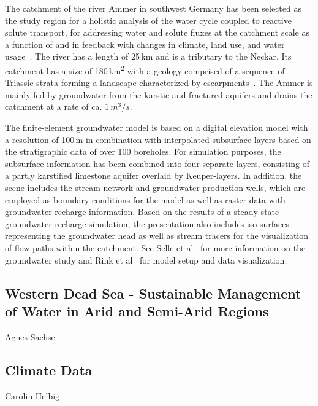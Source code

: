 \documentclass[twocolumn]{svjour3}          %
\begin{document}
The catchment of the river Ammer in southwest Germany has been selected as the study region for a holistic analysis of the water cycle coupled to reactive solute transport, for addressing water and solute fluxes at the catchment scale as a function of and in feedback with changes in climate, land use, and water usage~\cite{grathwohl:wessti}. The river has a length of 25\,km and is a tributary to the Neckar. Its catchment has a size of 180\,km\textsuperscript{2} with a geology comprised of a sequence of Triassic strata forming a landscape characterized by escarpments~\cite{selle:wessti}. The Ammer is mainly fed by groundwater from the karstic and fractured aquifers and drains the catchment at a rate of ca. $1\,m^3/s$.

The finite-element groundwater model is based on a digital elevation model with a resolution of 100\,m in combination with interpolated subsurface layers based on the stratigraphic data of over 100 boreholes. For simulation purposes, the subsurface information has been combined into four separate layers, consisting of a partly karstified limestone aquifer overlaid by Keuper-layers. In addition, the scene includes the stream network and groundwater production wells, which are employed as boundary conditions for the model as well as raster data with groundwater recharge information. Based on the results of a steady-state groundwater recharge simulation, the presentation also includes iso-surfaces representing the groundwater head as well as stream tracers for the visualization of flow paths within the catchment. See Selle et al~\cite{selle:wessti} for more information on the groundwater study and Rink et al~\cite{rink:wessti} for model setup and data visualization.

\subsection{Western Dead Sea - Sustainable Management of Water in Arid and Semi-Arid
Regions}
\label{western-dead-sea---sustainable-management-of-water-in-arid-and-semi-arid-regions}

Agnes Sachse \cite{graebe:modelcare}

\subsection{Climate Data}
\label{climate-data}

Carolin Helbig
\end{document}
